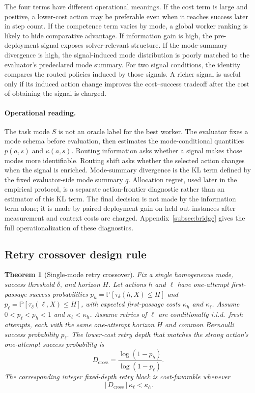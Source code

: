 \documentclass{article}
\newtheorem{theorem}{Theorem}
\newcommand{\Prb}{\mathbb{P}}
\newcommand{\Dcross}{D_{\mathrm{cross}}}
\begin{document}
The four terms have different operational meanings.
If the cost term is large and positive, a lower-cost action may be preferable even when it reaches success later in step count.
If the competence term varies by mode, a global worker ranking is likely to hide comparative advantage.
If information gain is high, the pre-deployment signal exposes solver-relevant structure.
If the mode-summary divergence is high, the signal-induced mode distribution is poorly matched to the evaluator's predeclared mode summary.
For two signal conditions, the identity compares the routed policies induced by those signals.
A richer signal is useful only if its induced action change improves the cost--success tradeoff after the cost of obtaining the signal is charged.

\paragraph{Operational reading.}
The task mode $S$ is not an oracle label for the best worker.
The evaluator fixes a mode schema before evaluation, then estimates the mode-conditional quantities $p(a,s)$ and $\kappa(a,s)$.
Routing information asks whether a signal makes those modes more identifiable.
Routing shift asks whether the selected action changes when the signal is enriched.
Mode-summary divergence is the KL term defined by the fixed evaluator-side mode summary $q$.
Allocation regret, used later in the empirical protocol, is a separate action-frontier diagnostic rather than an estimator of this KL term.
The final decision is not made by the information term alone; it is made by paired deployment gain on held-out instances after measurement and context costs are charged.
Appendix~\ref{subsec:bridge} gives the full operationalization of these diagnostics.

\subsection{Retry crossover design rule}
\label{sec:crossover}

\begin{theorem}[Single-mode retry crossover]
\label{thm:crossover}
Fix a single homogeneous mode, success threshold $\delta$, and horizon $H$.
Let actions $h$ and $\ell$ have one-attempt first-passage success probabilities
$p_h=\Prb[\tau_\delta(h,X)\le H]$ and $p_\ell=\Prb[\tau_\delta(\ell,X)\le H]$,
with expected first-passage costs $\kappa_h$ and $\kappa_\ell$.
Assume $0<p_\ell<p_h<1$ and $\kappa_\ell<\kappa_h$.
Assume retries of $\ell$ are conditionally i.i.d.\ fresh attempts, each with the same one-attempt horizon $H$ and common Bernoulli success probability $p_\ell$.
The lower-cost retry depth that matches the strong action's one-attempt success probability is
\[
\Dcross=\frac{\log(1-p_h)}{\log(1-p_\ell)}.
\]
The corresponding integer fixed-depth retry block is cost-favorable whenever
\[
\left\lceil \Dcross \right\rceil \kappa_\ell < \kappa_h .
\]
\end{theorem}
\end{document}
